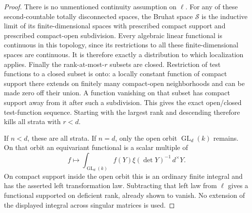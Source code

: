 \begin{proof}
There is no unmentioned continuity assumption on \(\ell\).
For any of these second-countable totally disconnected
spaces, the Bruhat space \(\mathcal S\) is the inductive
limit of its finite-dimensional spaces with prescribed
compact support and prescribed compact-open subdivision.
Every algebraic linear functional is continuous in this
topology, since its restrictions to all these finite-dimensional
spaces are continuous. It is therefore exactly a distribution
to which localization applies.
Finally the rank-at-most-\(r\) subsets are closed.
Restriction of test functions to a closed subset is onto:
a locally constant function of compact support there extends
on finitely many compact-open neighborhoods and can be
made zero off their union. A function vanishing on that
subset has compact support away from it after such a
subdivision. This gives the exact open/closed test-function
sequence. Starting with the largest rank and descending
therefore kills all strata with \(r<d\).

If \(n<d\), these are all strata. If \(n=d\), only the open
orbit \(\operatorname{GL}_d(k)\) remains. On that orbit an
equivariant functional is a scalar multiple of
\[
                  f\longmapsto
                    \int_{\operatorname{GL}_d(k)}
                         f(Y)\xi(\det Y)^{-1}\,d^\times Y .
\]
On compact support inside the open orbit this is an ordinary
finite integral and has the asserted left transformation law.
Subtracting that left law from \(\ell\) gives a functional
supported on deficient rank, already shown to vanish. No
extension of the displayed integral across singular matrices
is used.
\end{proof}

